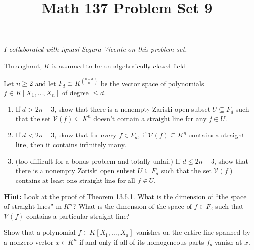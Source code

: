 \documentclass[11pt,letterpaper]{article}
\title{\textbf{Math 137 Problem Set 9}}
\begin{document}
\maketitle

\begin{center}
    \textit{I collaborated with Ignasi Segura Vicente on this problem set.}
\end{center}

Throughout, $K$ is assumed to be an algebraically closed field.

\begin{problem}[bonus]
    Let $n\geq2$ and let $F_d\cong K^{\binom{n+d}{n}}$ be the vector space of polynomials $f\in K[X_1,\dots,X_n]$ of degree $\leq d$.
    \begin{enumerate}[label=\alph*)]
        \item If $d>2n-3$, show that there is a nonempty Zariski open subset $U\subseteq F_d$ such that the set $\mathcal V(f)\subseteq K^n$ doesn't contain a straight line for any $f\in U$.
        \item If $d<2n-3$, show that for every $f\in F_d$, if $\mathcal V(f)\subseteq K^n$ contains a straight line, then it contains infinitely many.
        \item (too difficult for a bonus problem and totally unfair) If $d\leq 2n-3$, show that there is a nonempty Zariski open subset $U\subseteq F_d$ such that the set $\mathcal V(f)$ contains at least one straight line for all $f\in U$.
    \end{enumerate}
    \textbf{Hint:} Look at the proof of Theorem 13.5.1. What is the dimension of ``the space of straight lines'' in $K^n$? What is the dimension of the space of $f\in F_d$ such that $\mathcal V(f)$ contains a particular straight line?
\end{problem}

\begin{problem}
    Show that a polynomial $f\in K[X_1,\dots,X_n]$ vanishes on the entire line spanned by a nonzero vector $x\in K^n$ if and only if all of its homogeneous parts $f_d$ vanish at $x$.
\end{problem}
\end{document}
